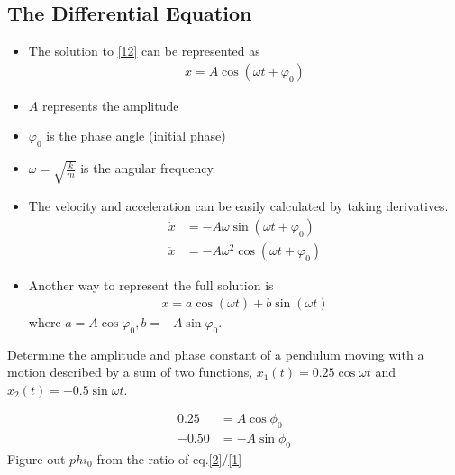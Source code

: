 \documentclass[a4paper]{article}
\numberwithin{equation}{section}
\begin{document}
\subsection{The Differential Equation}
\begin{itemize}
    \item The solution to \eqref{12} can be represented as \begin{align}
        x=A\cos(\omega t+\varphi_0)
    \end{align} 
    \item $A$ represents the amplitude
    \item $\varphi_0$ is the phase angle (initial phase)
    \item $\omega=\sqrt{\frac{k}{m}}$ is the angular frequency.
    \item The velocity and acceleration can be easily calculated by taking derivatives.
    \begin{align}
        \dot x&=-A\omega\sin(\omega t+\varphi_0)\\
        \ddot x&=-A\omega^2\cos(\omega t+\varphi_0)
    \end{align}
    \item Another way to represent the full solution is
    \begin{align}
        x=a\cos(\omega t)+b\sin(\omega t)
    \end{align}
    where $a=A\cos\varphi_0, b=-A\sin\varphi_0$.
\end{itemize}

\begin{example}
    Determine the amplitude and phase constant of a pendulum moving with a motion described by a sum of two functions, $x_1(t)=0.25\cos\omega t$ and $x_2(t)=-0.5\sin\omega t$.
\end{example}
\begin{sol}
    \begin{align}
        0.25&=A\cos\phi_0\label{1}\\
        -0.50&=-A\sin\phi_0\label{2}
    \end{align}
    Figure out $phi_0$ from the ratio of eq.\eqref{2}/\eqref{1} %
\end{sol}
\end{document}
